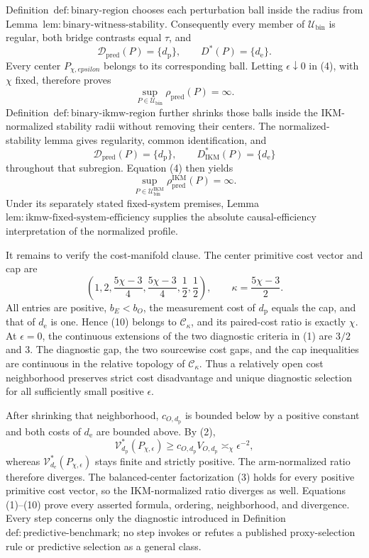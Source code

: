 Definition~\(\mathrm{def{:}binary\text{-}region}\) chooses each perturbation ball inside the radius from Lemma~\(\mathrm{lem{:}binary\text{-}witness\text{-}stability}\).  Consequently every member of \(\mathcal U_{\mathrm{bin}}\) is regular, both bridge contrasts equal \(\tau\), and
\[
 \mathcal D_{\mathrm{pred}}(P)=\{d_{\mathrm p}\},
 \qquad D^*(P)=\{d_{\mathrm e}\}.                       \tag{7}
\]
Every center \(P_{\chi,epsilon}\) belongs to its corresponding ball.  Letting \(\epsilon\downarrow0\) in (4), with \(\chi\) fixed, therefore proves
\[
 \sup_{P\in\mathcal U_{\mathrm{bin}}}
 \rho_{\mathrm{pred}}(P)=\infty.                         \tag{8}
\]
Definition~\(\mathrm{def{:}binary\text{-}ikmw\text{-}region}\) further shrinks those balls inside the IKM-normalized stability radii without removing their centers.  The normalized-stability lemma gives regularity, common identification, and
\[
 \mathcal D_{\mathrm{pred}}(P)=\{d_{\mathrm p}\},
 \qquad D_{\mathrm{IKM}}^*(P)=\{d_{\mathrm e}\}
\]
throughout that subregion.  Equation (4) then yields
\[
 \sup_{P\in\mathcal U_{\mathrm{bin}}^{\mathrm{IKM}}}
 \rho_{\mathrm{pred}}^{\mathrm{IKM}}(P)=\infty.          \tag{9}
\]
Under its separately stated fixed-system premises, Lemma~\(\mathrm{lem{:}ikmw\text{-}fixed\text{-}system\text{-}efficiency}\) supplies the absolute causal-efficiency interpretation of the normalized profile.

It remains to verify the cost-manifold clause.  The center primitive cost vector and cap are
\[
 \left(1,2,\frac{5\chi-3}{4},\frac{5\chi-3}{4},
             \frac12,\frac12\right),
 \qquad \kappa=\frac{5\chi-3}{2}.                        \tag{10}
\]
All entries are positive, \(b_E<b_O\), the measurement cost of \(d_{\mathrm p}\) equals the cap, and that of \(d_{\mathrm e}\) is one.  Hence (10) belongs to \(\mathcal C_\kappa\), and its paired-cost ratio is exactly \(\chi\).  At \(\epsilon=0\), the continuous extensions of the two diagnostic criteria in (1) are \(3/2\) and \(3\).  The diagnostic gap, the two sourcewise cost gaps, and the cap inequalities are continuous in the relative topology of \(\mathcal C_\kappa\).  Thus a relatively open cost neighborhood preserves strict cost disadvantage and unique diagnostic selection for all sufficiently small positive \(\epsilon\).

After shrinking that neighborhood, \(c_{O,d_{\mathrm p}}\) is bounded below by a positive constant and both costs of \(d_{\mathrm e}\) are bounded above.  By (2),
\[
 \mathcal V_{d_{\mathrm p}}^*(P_{\chi,\epsilon})
 \ge c_{O,d_{\mathrm p}}V_{O,d_{\mathrm p}}
 \asymp_\chi\epsilon^{-2},
\]
whereas \(\mathcal V_{d_{\mathrm e}}^*(P_{\chi,\epsilon})\) stays finite and strictly positive.  The arm-normalized ratio therefore diverges.  The balanced-center factorization (3) holds for every positive primitive cost vector, so the IKM-normalized ratio diverges as well.  Equations (1)--(10) prove every asserted formula, ordering, neighborhood, and divergence.  Every step concerns only the diagnostic introduced in Definition~\(\mathrm{def{:}predictive\text{-}benchmark}\); no step invokes or refutes a published proxy-selection rule or predictive selection as a general class.